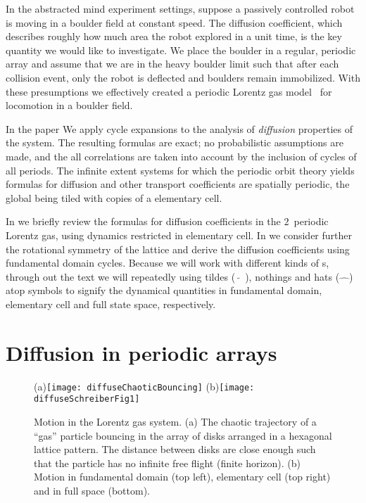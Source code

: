 \documentclass[aps,pre,showpacs,preprint,groupedaddress,floatfix]{revtex4-1}
\begin{document}
In the abstracted mind experiment settings, suppose a passively
controlled robot is moving in a boulder field at constant speed. The
diffusion coefficient, which describes roughly how much area the robot
explored in a unit time, is the key quantity we would like to
investigate. We place the boulder in a regular, periodic array and
assume that we are in the heavy boulder limit such that after each
collision event, only the robot is deflected and boulders remain
immobilized. With these presumptions we effectively created a periodic
Lorentz gas model~\cite{} for locomotion in a boulder field.

In the paper We apply cycle expansions to the analysis of {\em
  diffusion} properties of the system. The resulting formulas are
exact; no probabilistic assumptions are made, and the all correlations
are taken into account by the inclusion of cycles of all periods. The
infinite extent systems for which the periodic orbit theory yields
formulas for diffusion and other transport coefficients are spatially
periodic, the global {\statesp} being tiled with copies of a
elementary cell.

In  we briefly review the formulas for diffusion
coefficients in the $2$\dmn\ periodic Lorentz gas, using dynamics
restricted in elementary cell. In we
consider further the rotational symmetry of the lattice and derive the
diffusion coefficients using fundamental domain cycles. Because we
will work with different kinds of \statesp s, through out the text we
will repeatedly using tildes ($\tilde{\quad}$), nothings and hats
($\hat{\quad}$) atop symbols to signify the dynamical quantities in
fundamental domain, elementary cell and full state space,
respectively.

\section{Diffusion in periodic arrays}
\label{s-DiffPerArr}

\begin{figure}[htbp]
  \begin{center}
    (a)\texttt{[image: diffuseChaoticBouncing]}
    (b)\texttt{[image: diffuseSchreiberFig1]}
  \end{center}
  \caption[]{\label{fig-chaoticBouncing} Motion in the Lorentz gas
    system. (a) The chaotic trajectory of a ``gas'' particle bouncing
    in the array of disks arranged in a hexagonal lattice pattern. The
    distance between disks are close enough such that the particle has
    no infinite free flight (finite horizon). (b) Motion in
    fundamental domain (top left), elementary cell (top right) and in
    full space (bottom). }
\end{figure}
\end{document}
